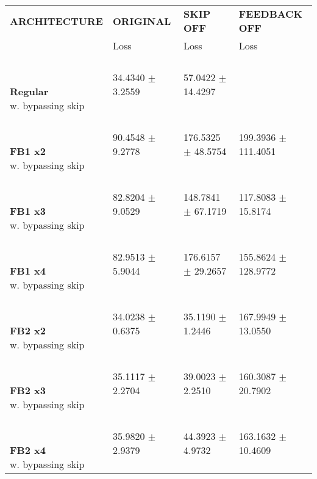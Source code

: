 
\begin{table}[ht]
    \centering
    \begin{tabular}{|>{\columncolor{gray!05}}l|l|l|l|}
        \hline
        \rowcolor{gray!20}
        \textbf{\footnotesize ARCHITECTURE} & \textbf{\footnotesize ORIGINAL} & \textbf{\footnotesize SKIP OFF} & \textbf{\footnotesize FEEDBACK OFF} \\

        \rowcolor{gray!20}
        & {\footnotesize Loss} & {\footnotesize Loss} & {\footnotesize Loss} \\
        \hline
\shortstack[l]{\\ {} \\ \textbf{Regular}\\{w. bypassing skip}} & 34.4340 $\pm$ 3.2559 & 57.0422 $\pm$ 14.4297 &  \\
 \hline 
\shortstack[l]{\\ {} \\ \textbf{FB1 x2}\\{w. bypassing skip}} & 90.4548 $\pm$ 9.2778 & 176.5325 $\pm$ 48.5754 & 199.3936 $\pm$ 111.4051 \\
 \hline 
\shortstack[l]{\\ {} \\ \textbf{FB1 x3}\\{w. bypassing skip}} & 82.8204 $\pm$ 9.0529 & 148.7841 $\pm$ 67.1719 & 117.8083 $\pm$ 15.8174 \\
 \hline 
\shortstack[l]{\\ {} \\ \textbf{FB1 x4}\\{w. bypassing skip}} & 82.9513 $\pm$ 5.9044 & 176.6157 $\pm$ 29.2657 & 155.8624 $\pm$ 128.9772 \\
 \hline 
\shortstack[l]{\\ {} \\ \textbf{FB2 x2}\\{w. bypassing skip}} & 34.0238 $\pm$ 0.6375 & 35.1190 $\pm$ 1.2446 & 167.9949 $\pm$ 13.0550 \\
 \hline 
\shortstack[l]{\\ {} \\ \textbf{FB2 x3}\\{w. bypassing skip}} & 35.1117 $\pm$ 2.2704 & 39.0023 $\pm$ 2.2510 & 160.3087 $\pm$ 20.7902 \\
 \hline 
\shortstack[l]{\\ {} \\ \textbf{FB2 x4}\\{w. bypassing skip}} & 35.9820 $\pm$ 2.9379 & 44.3923 $\pm$ 4.9732 & 163.1632 $\pm$ 10.4609 \\

\end{tabular}
\end{table}
